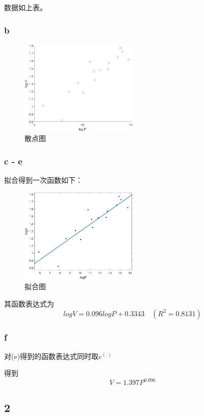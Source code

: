 \documentclass{article}
\begin{document}
数据如上表。

\newpage

\subsubsection{b}
\begin{figure}[!h]
    \centering
    \includegraphics[width=0.5\textwidth]{pic/hw5_1.png}
    \caption{散点图}
\end{figure}

\subsubsection{c - e}
拟合得到一次函数如下：

\begin{figure}[!h]
    \centering
    \includegraphics[width=0.5\textwidth]{pic/hw5_2.png}
    \caption{拟合图}
\end{figure}

其函数表达式为
\[log V = 0.096log P + 0.3343 \quad (R^2 = 0.8131)\]

\subsubsection{f}
对(e)得到的函数表达式同时取$e^{(.)}$

得到
\[V = 1.397P^{0.096}\]

\newpage

\subsection{2}
\end{document}
